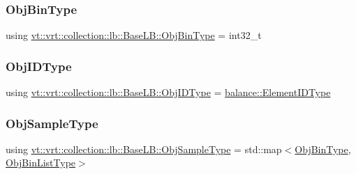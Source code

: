 \mbox{\label{structvt_1_1vrt_1_1collection_1_1lb_1_1_base_l_b_ae0bff8fcf0dec0abc1d81836cf1d060a}} 
\subsubsection{\texorpdfstring{Obj\+Bin\+Type}{ObjBinType}}
{\footnotesize\ttfamily using \hyperlink{structvt_1_1vrt_1_1collection_1_1lb_1_1_base_l_b_ae0bff8fcf0dec0abc1d81836cf1d060a}{vt\+::vrt\+::collection\+::lb\+::\+Base\+L\+B\+::\+Obj\+Bin\+Type} =  int32\+\_\+t}

\mbox{\label{structvt_1_1vrt_1_1collection_1_1lb_1_1_base_l_b_a15a2f756b59c8c2437985206b32aa403}} 
\subsubsection{\texorpdfstring{Obj\+I\+D\+Type}{ObjIDType}}
{\footnotesize\ttfamily using \hyperlink{structvt_1_1vrt_1_1collection_1_1lb_1_1_base_l_b_a15a2f756b59c8c2437985206b32aa403}{vt\+::vrt\+::collection\+::lb\+::\+Base\+L\+B\+::\+Obj\+I\+D\+Type} =  \hyperlink{namespacevt_1_1vrt_1_1collection_1_1balance_a14c8d2c972f2913aa3f1636e5be0a120}{balance\+::\+Element\+I\+D\+Type}}

\mbox{\label{structvt_1_1vrt_1_1collection_1_1lb_1_1_base_l_b_a331d7da5bbf2883238427d86b54ddd7b}} 
\subsubsection{\texorpdfstring{Obj\+Sample\+Type}{ObjSampleType}}
{\footnotesize\ttfamily using \hyperlink{structvt_1_1vrt_1_1collection_1_1lb_1_1_base_l_b_a331d7da5bbf2883238427d86b54ddd7b}{vt\+::vrt\+::collection\+::lb\+::\+Base\+L\+B\+::\+Obj\+Sample\+Type} =  std\+::map$<$\hyperlink{structvt_1_1vrt_1_1collection_1_1lb_1_1_base_l_b_ae0bff8fcf0dec0abc1d81836cf1d060a}{Obj\+Bin\+Type}, \hyperlink{structvt_1_1vrt_1_1collection_1_1lb_1_1_base_l_b_ab29c64ca66a928f34cf638dad6163f80}{Obj\+Bin\+List\+Type}$>$}

